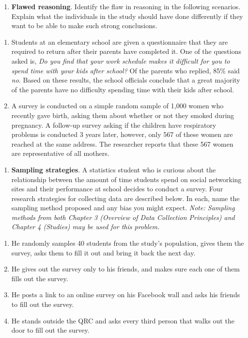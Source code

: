 \documentclass[
  letterpaper,
  DIV=11,
  numbers=noendperiod]{scrreprt}
\providecommand{\tightlist}{%
  \setlength{\itemsep}{0pt}\setlength{\parskip}{0pt}}\usepackage{longtable,booktabs,array}
\begin{document}
\begin{enumerate}
\def\labelenumi{\arabic{enumi}.}
\setcounter{enumi}{1}
\tightlist
\item
  \textbf{Flawed reasoning}. Identify the flaw in reasoning in the
  following scenarios. Explain what the individuals in the study should
  have done differently if they want to be able to make such strong
  conclusions.
\end{enumerate}

\begin{enumerate}
\def\labelenumi{\alph{enumi}.}
\item
  Students at an elementary school are given a questionnaire that they
  are required to return after their parents have completed it. One of
  the questions asked is, \emph{Do you find that your work schedule
  makes it difficult for you to spend time with your kids after school?}
  Of the parents who replied, 85\% said \emph{no}. Based on these
  results, the school officials conclude that a great majority of the
  parents have no difficulty spending time with their kids after school.
\item
  A survey is conducted on a simple random sample of 1,000 women who
  recently gave birth, asking them about whether or not they smoked
  during pregnancy. A follow-up survey asking if the children have
  respiratory problems is conducted 3 years later, however, only 567 of
  these women are reached at the same address. The researcher reports
  that these 567 women are representative of all mothers.
\end{enumerate}

\begin{enumerate}
\def\labelenumi{\arabic{enumi}.}
\setcounter{enumi}{2}
\tightlist
\item
  \textbf{Sampling strategies}. A statistics student who is curious
  about the relationship between the amount of time students spend on
  social networking sites and their performance at school decides to
  conduct a survey. Four research strategies for collecting data are
  described below. In each, name the sampling method proposed and any
  bias you might expect. \emph{Note: Sampling methods from both Chapter
  3 (Overview of Data Collection Principles) and Chapter 4 (Studies) may
  be used for this problem.}
\end{enumerate}

\begin{enumerate}
\def\labelenumi{\alph{enumi}.}
\item
  He randomly samples 40 students from the study's population, gives
  them the survey, asks them to fill it out and bring it back the next
  day.
\item
  He gives out the survey only to his friends, and makes sure each one
  of them fills out the survey.
\item
  He posts a link to an online survey on his Facebook wall and asks his
  friends to fill out the survey.
\item
  He stands outside the QRC and asks every third person that walks out
  the door to fill out the survey.
\end{enumerate}
\end{document}

